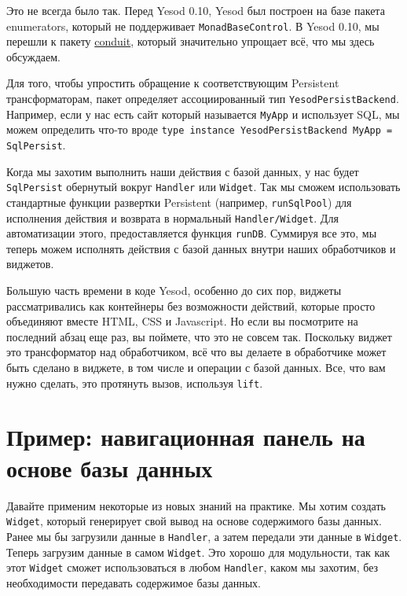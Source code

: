 \begin{remark}
Это не всегда было так. Перед Yesod 0.10, Yesod был построен на базе пакета enumerators, 
который не поддерживает \lstinline'MonadBaseControl'. В Yesod 0.10, мы перешли к пакету 
\href{http://hackage.haskell.org/package/conduit}{conduit}\footnotemark,
который значительно упрощает всё, что мы здесь обсуждаем.
\end{remark}

Для того, чтобы упростить обращение к соответствующим Persistent трансформаторам, пакет 
 определяет
ассоциированный тип \lstinline'YesodPersistBackend'. Например, если у нас есть сайт
который называется \lstinline'MyApp' и использует SQL, мы можем определить что-то вроде 
\lstinline'type instance YesodPersistBackend MyApp = SqlPersist'.

Когда мы захотим выполнить наши действия с базой данных, у нас будет
\lstinline'SqlPersist' обернутый вокруг \lstinline'Handler' или \lstinline'Widget'. Так мы
сможем использовать стандартные функции развертки Persistent (например,
\lstinline'runSqlPool') для исполнения действия и возврата в нормальный
\lstinline'Handler/Widget'. Для автоматизации этого, предоставляется функция
\lstinline'runDB'. Суммируя все это, мы теперь можем исполнять действия с базой данных
внутри наших обработчиков и виджетов.

Большую часть времени в коде Yesod, особенно до сих пор, виджеты рассматривались как 
контейнеры без возможности действий, которые просто объединяют вместе HTML, CSS и
Javascript. Но если вы посмотрите на последний абзац еще раз, вы поймете, что это не
совсем так. Поскольку виджет это трансформатор над обработчиком, всё что вы делаете в
обработчике может быть сделано в виджете, в том числе и операции с базой данных. Все, что
вам нужно сделать, это протянуть вызов, используя \lstinline'lift'.

\section{Пример: навигационная панель на основе базы данных}

Давайте применим некоторые из новых знаний на практике. Мы хотим создать
\lstinline'Widget', который генерирует свой вывод на основе содержимого базы данных. Ранее
мы бы загрузили данные в \lstinline'Handler', а затем передали эти данные в
\lstinline'Widget'. Теперь загрузим данные в самом \lstinline'Widget'. Это хорошо для
модульности, так как этот \lstinline'Widget' сможет использоваться в любом
\lstinline'Handler', каком мы захотим, без необходимости передавать содержимое базы
данных.

